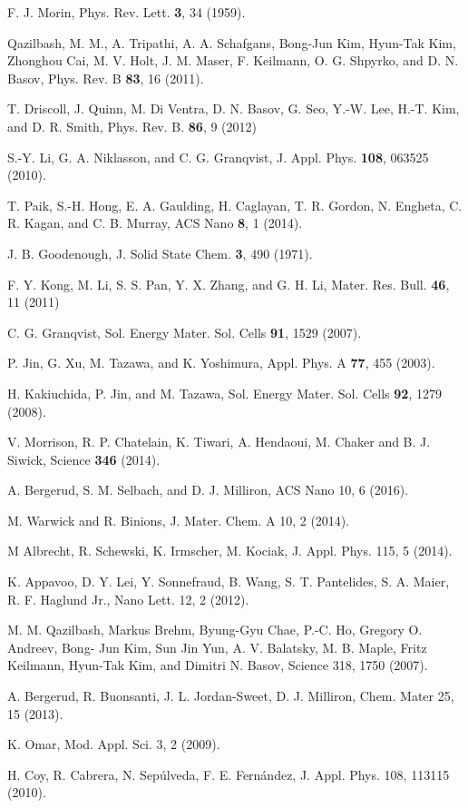 \documentclass[a4paper]{article}
\begin{document}
\begin{thebibliography}{6}

F. J. Morin, Phys. Rev. Lett. \textbf{3}, 34 (1959).

Qazilbash, M. M., A. Tripathi, A. A. Schafgans, Bong-Jun Kim, Hyun-Tak Kim, Zhonghou Cai, M. V. Holt, J. M. Maser, F. Keilmann, O. G. Shpyrko, and D. N. Basov, Phys. Rev. B \textbf{83}, 16 (2011).

T. Driscoll, J. Quinn, M. Di Ventra, D. N. Basov, G. Seo, Y.-W. Lee, H.-T. Kim, and D. R. Smith, Phys. Rev. B. \textbf{86}, 9 (2012)

S.-Y. Li, G. A. Niklasson, and C. G. Granqvist, J. Appl. Phys. \textbf{108}, 063525 (2010).

T. Paik, S.-H. Hong, E. A. Gaulding, H. Caglayan, T. R. Gordon, N. Engheta, C. R. Kagan, and C. B. Murray, ACS Nano \textbf{8}, 1 (2014).

J. B. Goodenough, J. Solid State Chem. \textbf{3}, 490 (1971). 

F. Y. Kong, M. Li, S. S. Pan, Y. X. Zhang, and G. H. Li, Mater. Res. Bull. \textbf{46}, 11 (2011)

C. G. Granqvist, Sol. Energy Mater. Sol. Cells \textbf{91}, 1529 (2007). 

P. Jin, G. Xu, M. Tazawa, and K. Yoshimura, Appl. Phys. A \textbf{77}, 455 (2003).

H. Kakiuchida, P. Jin, and M. Tazawa, Sol. Energy Mater. Sol. Cells \textbf{92}, 1279 (2008). 

V. Morrison, R. P. Chatelain, K. Tiwari, A. Hendaoui, M. Chaker and B. J. Siwick, Science \textbf{346} (2014).

A. Bergerud, S. M. Selbach, and D. J. Milliron, ACS Nano 10, 6 (2016).

M. Warwick and R. Binions, J. Mater. Chem. A 10, 2 (2014).

M Albrecht, R. Schewski, K. Irmscher, M. Kociak, J. Appl. Phys. 115, 5 (2014).

K. Appavoo, D. Y. Lei, Y. Sonnefraud, B. Wang, S. T. Pantelides, S. A. Maier, R. F. Haglund
Jr., Nano Lett. 12, 2 (2012).

M. M. Qazilbash, Markus Brehm, Byung-Gyu Chae, P.-C. Ho, Gregory O. Andreev, Bong-
Jun Kim, Sun Jin Yun, A. V. Balatsky, M. B. Maple, Fritz Keilmann, Hyun-Tak Kim, and
Dimitri N. Basov, Science 318, 1750 (2007).

A. Bergerud, R. Buonsanti, J. L. Jordan-Sweet, D. J. Milliron, Chem. Mater 25, 15 (2013).

K. Omar, Mod. Appl. Sci. 3, 2 (2009).

H. Coy, R. Cabrera, N. Sepúlveda, F. E. Fernández, J. Appl. Phys. 108, 113115 (2010).



\end{thebibliography}
\end{document}
